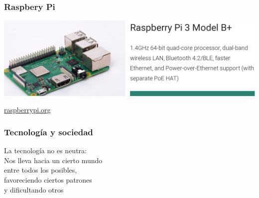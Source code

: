 \documentclass[17pt,aspectratio=169]{beamer}
\renewcommand{\secimage}{figs/bookpages}
\newcommand{\secimage}{figs/bookpages}
\begin{document}
\begin{frame}
\frametitle{Raspbery Pi}

\includegraphics[width=\linewidth]{figs/raspberry-pi}

\begin{flushright}
\href{https://raspberrypi.org}{raspberrypi.org}
\end{flushright}

\end{frame}


\begin{frame}
\frametitle{Tecnología y sociedad}

{\Large
La tecnología no es neutra: \\
Nos lleva hacia un cierto mundo \\
entre todos los posibles, \\
favoreciendo ciertos patrones \\
y dificultando otros \\
}

\end{frame}



\end{document}
